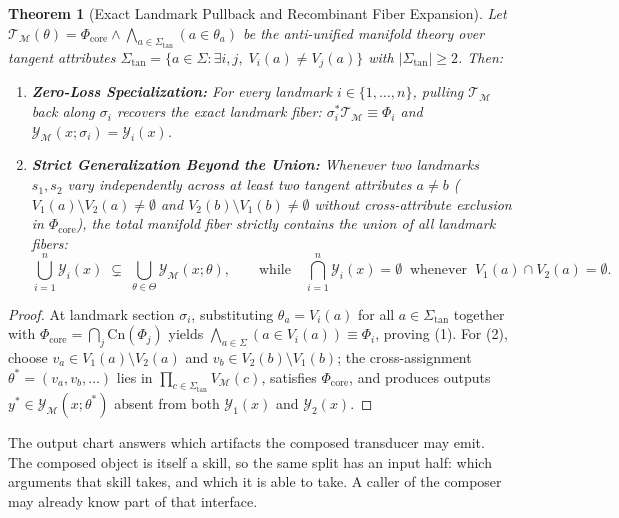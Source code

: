 \documentclass[11pt]{article}
\theoremstyle{definition}
\theoremstyle{plain}
\newtheorem{theorem}{Theorem}
\newcommand{\Ycal}{\mathcal{Y}}
\newcommand{\Mcal}{\mathcal{M}}
\newcommand{\Tcal}{\mathcal{T}}
\newcommand{\Phicore}{\Phi_{\mathrm{core}}}
\begin{document}
\begin{theorem}[Exact Landmark Pullback and Recombinant Fiber Expansion]
\label{thm:antiunify}
Let $\Tcal_{\Mcal}(\theta) = \Phicore \land \bigwedge_{a \in \Sigma_{\mathrm{tan}}} (a \in \theta_a)$ be the anti-unified manifold theory over tangent attributes $\Sigma_{\mathrm{tan}} = \{a \in \Sigma : \exists i,j,\; V_i(a) \neq V_j(a)\}$ with $|\Sigma_{\mathrm{tan}}| \ge 2$. Then:
\begin{enumerate}[leftmargin=1.8em,itemsep=1pt,topsep=2pt]
  \item \textbf{Zero-Loss Specialization:} For every landmark $i \in \{1, \dots, n\}$, pulling $\Tcal_{\Mcal}$ back along $\sigma_i$ recovers the exact landmark fiber: $\sigma_i^* \Tcal_{\Mcal} \equiv \Phi_i$ and $\Ycal_{\Mcal}(x; \sigma_i) = \Ycal_i(x)$.
  \item \textbf{Strict Generalization Beyond the Union:} Whenever two landmarks $s_1, s_2$ vary independently across at least two tangent attributes $a \neq b$ ($V_1(a) \setminus V_2(a) \neq \emptyset$ and $V_2(b) \setminus V_1(b) \neq \emptyset$ without cross-attribute exclusion in $\Phicore$), the total manifold fiber strictly contains the union of all landmark fibers:
  \begin{equation}
    \bigcup_{i=1}^n \Ycal_i(x) \;\subsetneq\; \bigcup_{\theta \in \Theta} \Ycal_{\Mcal}(x; \theta),
    \qquad
    \text{while}\quad \bigcap_{i=1}^n \Ycal_i(x) = \emptyset \;\;\text{whenever}\;\; V_1(a) \cap V_2(a) = \emptyset.
  \end{equation}
\end{enumerate}
\end{theorem}

\begin{proof}
At landmark section $\sigma_i$, substituting $\theta_a = V_i(a)$ for all $a \in \Sigma_{\mathrm{tan}}$ together with $\Phicore = \bigcap_j \mathrm{Cn}(\Phi_j)$ yields $\bigwedge_{a \in \Sigma} (a \in V_i(a)) \equiv \Phi_i$, proving (1). For (2), choose $v_a \in V_1(a) \setminus V_2(a)$ and $v_b \in V_2(b) \setminus V_1(b)$; the cross-assignment $\theta^* = (v_a, v_b, \dots)$ lies in $\prod_{c \in \Sigma_{\mathrm{tan}}} V_{\Mcal}(c)$, satisfies $\Phicore$, and produces outputs $y^* \in \Ycal_{\Mcal}(x; \theta^*)$ absent from both $\Ycal_1(x)$ and $\Ycal_2(x)$.
\end{proof}

The output chart answers which artifacts the composed transducer may emit. The composed object is itself a skill, so the same split has an input half: which arguments that skill takes, and which it is able to take. A caller of the composer may already know part of that interface.
\end{document}
